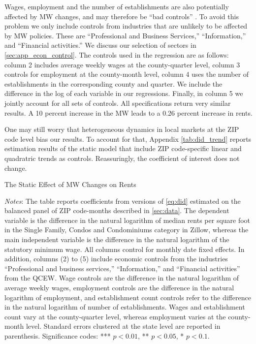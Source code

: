 Wages, employment and the number of establishments are also potentially affected by MW changes,
and may therefore be ``bad controls'' \parencite{AngristPischke2009}. To avoid this problem we 
only include controls from industries that are unlikely to be affected by MW policies. These 
are ``Professional and Business Services,'' ``Information,'' and ``Financial activities.'' We 
discuss our selection of sectors in \autoref{sec:app_econ_control}. The controls used in the 
regression are as follows: column 2 includes average weekly wages at the county-quarter level, 
column 3 controls for employment at the county-month level, column 4 uses the number of 
establishments in the corresponding county and quarter. We include the difference in the log of 
each variable in our regressions. Finally, in column 5 we jointly account for all sets of 
controls. All specifications return very similar results. A 10 percent increase in the MW leads 
to a 0.26 percent increase in rents. 

One may still worry that heterogeneous dynamics in local markets at the ZIP code level bias our 
results. To account for that, Appendix \autoref{tab:did_trend} reports estimation results of the 
static model that include ZIP code-specific linear and quadratric trends as controls. 
Reassuringly, the coefficient of interest does not change.

\begin{table}[h!]
    \caption{The Static Effect of MW Changes on Rents}
    \label{tab:static_model}
    \centering
    
    \begin{minipage}{0.95\textwidth} \footnotesize
		\vspace{3mm} 
		\textit{Notes}: The table reports coefficients from versions of \autoref{eq:did} 
		estimated on the balanced panel of ZIP code-months described in \autoref{sec:data}. 
		The dependent variable is the difference in the natural logarithm of median	rents 
		per square foot in the Single Family, Condos and Condominiums category in Zillow, 
		whereas the main independent variable is the difference in the natural logarithm of 
		the statutory minimum wage. All columns control for monthly date fixed effects. In 
		addition, columns (2) to (5) include economic controls from the industries 
		``Professional and business services,'' ``Information,'' and ``Financial activities'' 
		from the QCEW. Wage controls are the difference in the natural logarithm of average 
		weekly wages, employment controls are the difference in the natural logarithm of 
		employment, and establishment count controls refer to the difference in the natural 
		logarithm of number of establishments. Wages and establishment count vary at the 
		county-quarter level, whereas employment varies at the county-month level. 
		Standard errors clustered at the state level are reported in parenthesis. Significance 
		codes: *** $p < 0.01$, ** $p < 0.05$, * $p < 0.1$.
	\end{minipage}
\end{table}

